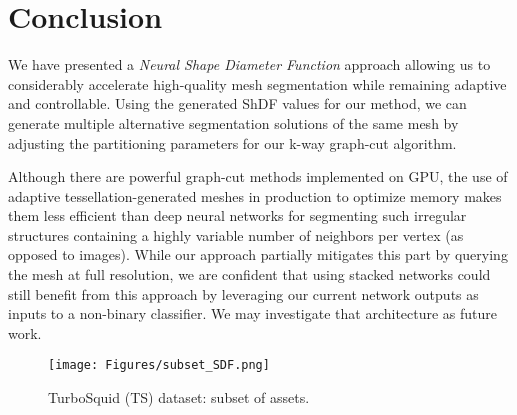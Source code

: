 \section{Conclusion}
We have presented a \textit{Neural Shape Diameter Function} approach allowing us to considerably accelerate high-quality mesh segmentation while remaining adaptive and controllable. Using the generated ShDF values for our method, we can generate multiple alternative segmentation solutions of the same mesh by adjusting the partitioning parameters for our k-way graph-cut algorithm.

Although there are powerful graph-cut methods implemented on GPU, the use of adaptive tessellation-generated meshes in production to optimize memory makes them less efficient than deep neural networks for segmenting such irregular structures containing a highly variable number of neighbors per vertex (as opposed to images). While our approach partially mitigates this part by querying the mesh at full resolution, we are confident that using stacked networks could still benefit from this approach by leveraging our current network outputs as inputs to a non-binary classifier. We may investigate that architecture as future work.

\begin{figure}
    \centering
    \texttt{[image: Figures/subset\_SDF.png]}
    \caption{TurboSquid (TS) dataset: subset of assets.}
    \label{fig:subset_SDF}
\end{figure}

